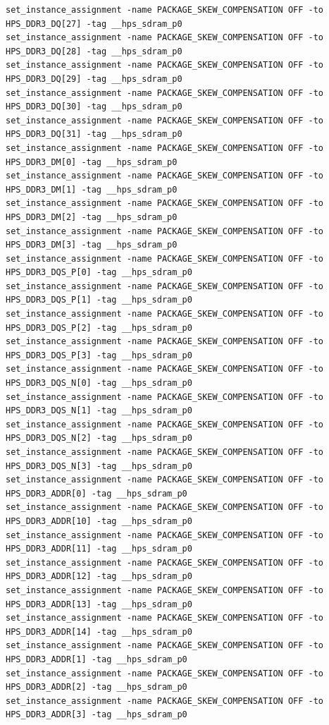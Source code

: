 \documentclass[conference]{IEEEtran}
\begin{document}
\begin{lstlisting}
set_instance_assignment -name PACKAGE_SKEW_COMPENSATION OFF -to HPS_DDR3_DQ[27] -tag __hps_sdram_p0
set_instance_assignment -name PACKAGE_SKEW_COMPENSATION OFF -to HPS_DDR3_DQ[28] -tag __hps_sdram_p0
set_instance_assignment -name PACKAGE_SKEW_COMPENSATION OFF -to HPS_DDR3_DQ[29] -tag __hps_sdram_p0
set_instance_assignment -name PACKAGE_SKEW_COMPENSATION OFF -to HPS_DDR3_DQ[30] -tag __hps_sdram_p0
set_instance_assignment -name PACKAGE_SKEW_COMPENSATION OFF -to HPS_DDR3_DQ[31] -tag __hps_sdram_p0
set_instance_assignment -name PACKAGE_SKEW_COMPENSATION OFF -to HPS_DDR3_DM[0] -tag __hps_sdram_p0
set_instance_assignment -name PACKAGE_SKEW_COMPENSATION OFF -to HPS_DDR3_DM[1] -tag __hps_sdram_p0
set_instance_assignment -name PACKAGE_SKEW_COMPENSATION OFF -to HPS_DDR3_DM[2] -tag __hps_sdram_p0
set_instance_assignment -name PACKAGE_SKEW_COMPENSATION OFF -to HPS_DDR3_DM[3] -tag __hps_sdram_p0
set_instance_assignment -name PACKAGE_SKEW_COMPENSATION OFF -to HPS_DDR3_DQS_P[0] -tag __hps_sdram_p0
set_instance_assignment -name PACKAGE_SKEW_COMPENSATION OFF -to HPS_DDR3_DQS_P[1] -tag __hps_sdram_p0
set_instance_assignment -name PACKAGE_SKEW_COMPENSATION OFF -to HPS_DDR3_DQS_P[2] -tag __hps_sdram_p0
set_instance_assignment -name PACKAGE_SKEW_COMPENSATION OFF -to HPS_DDR3_DQS_P[3] -tag __hps_sdram_p0
set_instance_assignment -name PACKAGE_SKEW_COMPENSATION OFF -to HPS_DDR3_DQS_N[0] -tag __hps_sdram_p0
set_instance_assignment -name PACKAGE_SKEW_COMPENSATION OFF -to HPS_DDR3_DQS_N[1] -tag __hps_sdram_p0
set_instance_assignment -name PACKAGE_SKEW_COMPENSATION OFF -to HPS_DDR3_DQS_N[2] -tag __hps_sdram_p0
set_instance_assignment -name PACKAGE_SKEW_COMPENSATION OFF -to HPS_DDR3_DQS_N[3] -tag __hps_sdram_p0
set_instance_assignment -name PACKAGE_SKEW_COMPENSATION OFF -to HPS_DDR3_ADDR[0] -tag __hps_sdram_p0
set_instance_assignment -name PACKAGE_SKEW_COMPENSATION OFF -to HPS_DDR3_ADDR[10] -tag __hps_sdram_p0
set_instance_assignment -name PACKAGE_SKEW_COMPENSATION OFF -to HPS_DDR3_ADDR[11] -tag __hps_sdram_p0
set_instance_assignment -name PACKAGE_SKEW_COMPENSATION OFF -to HPS_DDR3_ADDR[12] -tag __hps_sdram_p0
set_instance_assignment -name PACKAGE_SKEW_COMPENSATION OFF -to HPS_DDR3_ADDR[13] -tag __hps_sdram_p0
set_instance_assignment -name PACKAGE_SKEW_COMPENSATION OFF -to HPS_DDR3_ADDR[14] -tag __hps_sdram_p0
set_instance_assignment -name PACKAGE_SKEW_COMPENSATION OFF -to HPS_DDR3_ADDR[1] -tag __hps_sdram_p0
set_instance_assignment -name PACKAGE_SKEW_COMPENSATION OFF -to HPS_DDR3_ADDR[2] -tag __hps_sdram_p0
set_instance_assignment -name PACKAGE_SKEW_COMPENSATION OFF -to HPS_DDR3_ADDR[3] -tag __hps_sdram_p0

\end{lstlisting}
\end{document}
